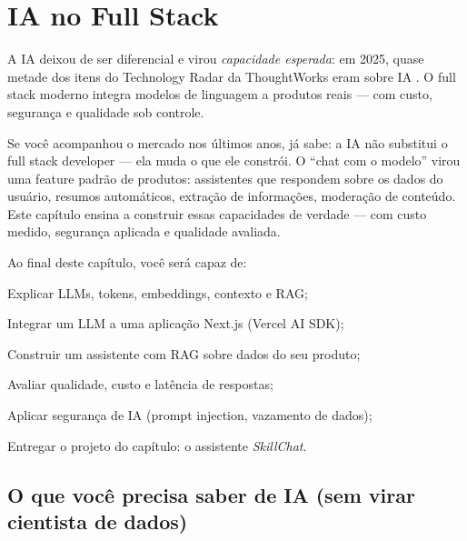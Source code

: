 \chapter{IA no Full Stack}
\label{cap:ia}

\begin{caixaconceito}
A IA deixou de ser diferencial e virou \emph{capacidade esperada}: em 2025,
quase metade dos itens do Technology Radar da ThoughtWorks eram sobre IA
\cite{thoughtworks33}. O full stack moderno integra modelos de linguagem a
produtos reais — com custo, segurança e qualidade sob controle.
\end{caixaconceito}

Se você acompanhou o mercado nos últimos anos, já sabe: a IA não substitui o full stack developer — ela muda o que
ele constrói. O ``chat com o modelo'' virou uma feature padrão de produtos:
assistentes que respondem sobre os dados do usuário, resumos automáticos,
extração de informações, moderação de conteúdo. Este capítulo ensina a
construir essas capacidades de verdade — com custo medido, segurança
aplicada e qualidade avaliada.

Ao final deste capítulo, você será capaz de:
\begin{objetivos}
  \item Explicar LLMs, tokens, embeddings, contexto e RAG;
  \item Integrar um LLM a uma aplicação Next.js (Vercel AI SDK);
  \item Construir um assistente com RAG sobre dados do seu produto;
  \item Avaliar qualidade, custo e latência de respostas;
  \item Aplicar segurança de IA (prompt injection, vazamento de dados);
  \item Entregar o projeto do capítulo: o assistente \emph{SkillChat}.
\end{objetivos}

\section{O que você precisa saber de IA (sem virar cientista de dados)}

